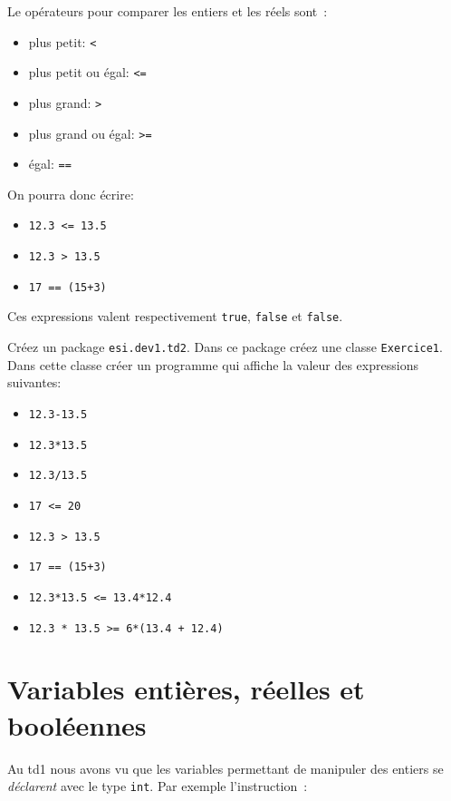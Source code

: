 \documentclass[a4paper,11pt]{article}
\begin{document}
	Le opérateurs pour comparer les entiers et les réels sont~:

	\begin{itemize}
		\item plus petit: \texttt{<}
		\item plus petit ou égal: \texttt{<=}
		\item plus grand: \texttt{>}
		\item plus grand ou égal: \texttt{>=}
		\item  égal: \texttt{==}
	\end{itemize} 

	On pourra donc écrire: 
	\begin{itemize}
		\item \texttt{12.3 <= 13.5}
		\item \texttt{12.3 > 13.5}
		\item \texttt{17 == (15+3)}
	\end{itemize}
	Ces expressions valent respectivement \texttt{true}, \texttt{false} et \texttt{false}.

	\hspeparator

\Exercice{}
	Créez un package \texttt{esi.dev1.td2}.
	Dans ce package créez une classe \texttt{Exercice1}.
	Dans cette classe créer un programme qui affiche la valeur des expressions suivantes:
	
	\begin{itemize}		
		\item \texttt{12.3-13.5}
		\item \texttt{12.3*13.5}
		\item \texttt{12.3/13.5}
		
		\item \texttt{17 <= 20}
		\item \texttt{12.3 > 13.5}
		\item \texttt{17 == (15+3)}
		\item \texttt{12.3*13.5 <= 13.4*12.4}
		\item \texttt{12.3 * 13.5 >= 6*(13.4 + 12.4)}
	\end{itemize}



\section{Variables entières, réelles et booléennes}


	Au td1 nous avons vu que les variables permettant de manipuler des entiers 
	se \emph{déclarent} avec le type \texttt{int}. Par exemple l'instruction~:
	
\end{document}
